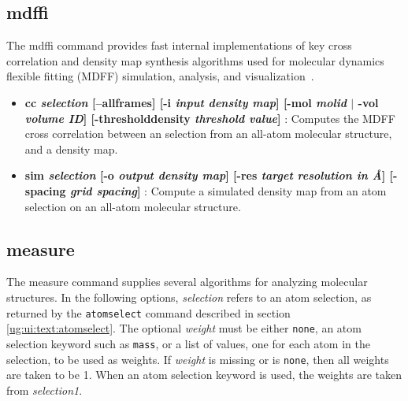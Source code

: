 
\subsection{mdffi}

The mdffi command provides fast internal implementations of 
key cross correlation and density map synthesis algorithms
used for molecular dynamics flexible fitting (MDFF) simulation,
analysis, and visualization~\cite{STON2014A}.

\begin{itemize}
\item {\bf cc {\it selection} [--allframes] [-i {\it input density map}] [-mol {\it molid} $|$ -vol {\it volume ID}] [-thresholddensity {\it threshold value}] }: 
  Computes the MDFF cross correlation between an selection from an all-atom  
  molecular structure, and a density map.

\item {\bf sim {\it selection} [-o {\it output density map}] [-res {\it target resolution in \AA}] [-spacing {\it grid spacing}] }: 
  Compute a simulated density map from an atom selection on an all-atom
  molecular structure.

\end{itemize}

 

\subsection{measure}

The measure command supplies several algorithms for analyzing molecular 
structures.  In the following options, {\it selection} refers to an atom
selection, as returned by the {\tt atomselect} command described in section
\ref{ug:ui:text:atomselect}.  The optional {\it weight} must be either 
{\tt none}, an atom selection keyword such as {\tt mass}, or a list of values, 
one for each atom in the selection, to be used as weights.  If {\it weight} 
is missing or is {\tt none}, then all weights are taken to be 1.  When
an atom selection keyword is used, the weights are taken from {\it selection1}.

